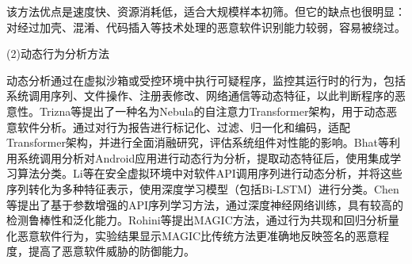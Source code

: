 
该方法优点是速度快、资源消耗低，适合大规模样本初筛。但它的缺点也很明显：对经过加壳、混淆、代码插入等技术处理的恶意软件识别能力较弱，容易被绕过。


(2)动态行为分析方法

动态分析通过在虚拟沙箱或受控环境中执行可疑程序，监控其运行时的行为，包括系统调用序列、文件操作、注册表修改、网络通信等动态特征，以此判断程序的恶意性。Trizna等\cite{trizna2024nebula}提出了一种名为Nebula的自注意力Transformer架构，用于动态恶意软件分析。通过对行为报告进行标记化、过滤、归一化和编码，适配Transformer架构，并进行全面消融研究，评估系统组件对性能的影响。Bhat等\cite{bhat2023system}利用系统调用分析对Android应用进行动态行为分析，提取动态特征后，使用集成学习算法分类。Li等\cite{li2022novel}在安全虚拟环境中对软件API调用序列进行动态分析，并将这些序列转化为多种特征表示，使用深度学习模型（包括Bi-LSTM）进行分类。Chen等\cite{chen2022cruparamer}提出了基于参数增强的API序列学习方法，通过深度神经网络训练，具有较高的检测鲁棒性和泛化能力。Rohini等\cite{rohini2024magic}提出MAGIC方法，通过行为共现和回归分析量化恶意软件行为，实验结果显示MAGIC比传统方法更准确地反映签名的恶意程度，提高了恶意软件威胁的防御能力。

